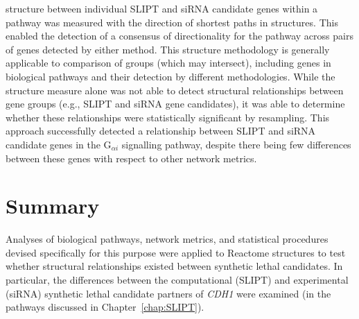 
 structure between individual \gls{SLIPT} and \gls{siRNA} candidate genes within a \gls{pathway} was measured with the direction of \glspl{shortest path} in  structures. This enabled the detection of a consensus of directionality for the \gls{pathway} across pairs of genes detected by either method. This  structure methodology is generally applicable to comparison of  groups (which may intersect), including genes in biological \glspl{pathway} and their detection by different methodologies. While the  structure measure alone was not able to detect structural  relationships between gene groups (e.g., \gls{SLIPT} and \gls{siRNA} gene candidates), it was able to determine whether these relationships were statistically significant by resampling. This approach successfully detected a relationship between \gls{SLIPT} and \gls{siRNA} candidate genes in the G$_{\alpha i}$ signalling \gls{pathway}, despite there being few differences between these genes with respect to other network metrics. %

\section{Summary}

Analyses of biological \glspl{pathway}, network metrics, and statistical procedures devised specifically for this purpose were applied to Reactome  structures to test whether structural relationships existed between \gls{synthetic lethal} candidates. In particular, the differences between the computational (\gls{SLIPT}) and experimental (\gls{siRNA}) \gls{synthetic lethal} candidate partners of \textit{CDH1} were examined (in the \glspl{pathway} discussed in Chapter~\ref{chap:SLIPT}).

